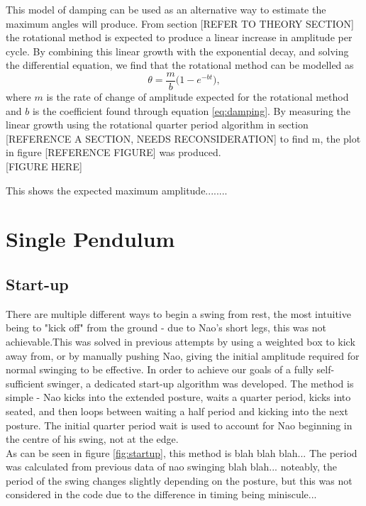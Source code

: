 \documentclass[11pt]{article}
\newcommand*\ruleline[1]{\par\noindent\raisebox{.8ex}{\makebox[\linewidth]{\hrulefill\hspace{1ex}\raisebox{-.8ex}{#1}\hspace{1ex}\hrulefill}}}
\begin{document}
This model of damping can be used as an alternative way to estimate the maximum angles will produce. From section [REFER TO THEORY SECTION] the rotational method is expected to produce a linear increase in amplitude per cycle. By combining this linear growth with the exponential decay, and solving the differential equation, we find that the rotational method can be modelled as
\begin{equation}
    \theta = \frac{m}{b}\big(1-e^{-bt}\big),
\end{equation}
where $m$ is the rate of change of amplitude expected for the rotational method and $b$ is the coefficient found through equation \ref{eq:damping}. By measuring the linear growth using the rotational quarter period algorithm in section [REFERENCE A SECTION, NEEDS RECONSIDERATION] to find m, the plot in figure [REFERENCE FIGURE] was produced.\\


[FIGURE HERE]

This shows the expected maximum amplitude........

\section{Single Pendulum}
\subsection{Start-up}
\ruleline{James Doering}
There are multiple different ways to begin a swing from rest, the most intuitive being to "kick off" from the ground - due to Nao's short legs, this was not achievable.This was solved in previous attempts by using a weighted box to kick away from, or by manually pushing Nao, giving the initial amplitude required for normal swinging to be effective. In order to achieve our goals of a fully self-sufficient swinger, a dedicated start-up algorithm was developed. The method is simple - Nao kicks into the extended posture, waits a quarter period, kicks into seated, and then loops between waiting a half period and kicking into the next posture. The initial quarter period wait is used to account for Nao beginning in the centre of his swing, not at the edge. \\



As can be seen in figure \ref{fig:startup}, this method is blah blah blah... The period was calculated from previous data of nao swinging blah blah... noteably, the period of the swing changes slightly depending on the posture, but this was not considered in the code due to the difference in timing being miniscule... \\
\end{document}
